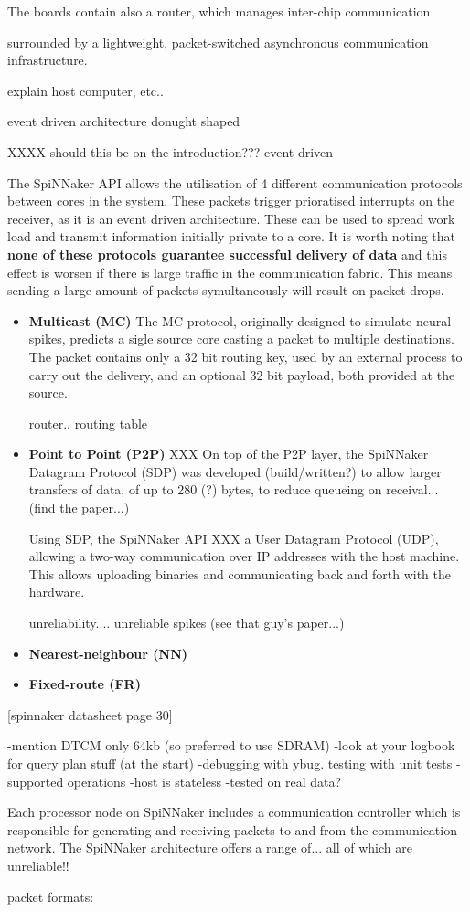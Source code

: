 The boards contain also a router, which manages inter-chip communication 


surrounded by a lightweight, packet-switched asynchronous communication infrastructure.

explain host computer, etc..


event driven architecture
donught shaped


XXXX should this be on the introduction???
event driven

The SpiNNaker API allows the utilisation of 4 different communication protocols between cores in the system. These packets trigger prioratised interrupts on the receiver, as it is an event driven architecture. These can be used to spread work load and transmit information initially private to a core.
It is worth noting that \textbf{none of these protocols guarantee successful delivery of data} and this effect is worsen if there is large traffic in the communication fabric. This means sending a large amount of packets symultaneously will result on packet drops.

\begin{itemize}
\item \textbf{Multicast (MC)}
The MC protocol, originally designed to simulate neural spikes, predicts a sigle source core casting a packet to multiple destinations. The packet contains only a 32 bit routing key, used by an external process to carry out the delivery, and an optional 32 bit payload, both provided at the source.

router.. routing table
\item \textbf{Point to Point (P2P)}
XXX
On top of the P2P layer, the SpiNNaker Datagram Protocol (SDP) was developed (build/written?) to allow larger transfers of data, of up to 280 (?) bytes, to reduce queueing on receival... (find the paper...)

Using SDP, the SpiNNaker API XXX a User Datagram Protocol (UDP), allowing a two-way communication over IP addresses with the host machine. This allows uploading binaries and communicating back and forth with the hardware.

unreliability....
unreliable spikes (see that guy's paper...)

\item \textbf{Nearest-neighbour (NN)}
\item \textbf{Fixed-route (FR)}
\end{itemize}

[spinnaker datasheet page 30]

-mention DTCM only 64kb (so preferred to use SDRAM)
-look at your logbook for query plan stuff (at the start)
-debugging with ybug. testing with unit tests
-supported operations
-host is stateless
-tested on real data?

Each processor node on SpiNNaker includes a communication controller which is responsible for generating and receiving packets to and from the communication network.
The SpiNNaker architecture offers a range of...
all of which are unreliable!!

packet formats:


